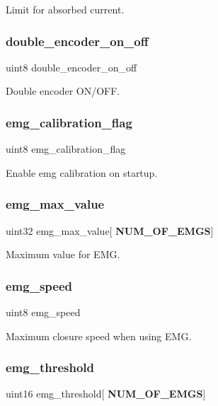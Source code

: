 Limit for absorbed current. \mbox{\label{structst__mem_a3d5832272cab9dc9f831471a9634b43e}} 
\subsubsection{double\+\_\+encoder\+\_\+on\+\_\+off}
{\footnotesize\ttfamily uint8 double\+\_\+encoder\+\_\+on\+\_\+off}

Double encoder O\+N/\+O\+FF. \mbox{\label{structst__mem_a78f0b0c6db2a7118cd15ec0aa38ccdb9}} 
\subsubsection{emg\+\_\+calibration\+\_\+flag}
{\footnotesize\ttfamily uint8 emg\+\_\+calibration\+\_\+flag}

Enable emg calibration on startup. \mbox{\label{structst__mem_aeb71cf2bff2584abb616d4b5dcc4c4af}} 
\subsubsection{emg\+\_\+max\+\_\+value}
{\footnotesize\ttfamily uint32 emg\+\_\+max\+\_\+value[\textbf{ N\+U\+M\+\_\+\+O\+F\+\_\+\+E\+M\+GS}]}

Maximum value for E\+MG. \mbox{\label{structst__mem_ae8e800591064bf14eb2dd3a3fb2c325b}} 
\subsubsection{emg\+\_\+speed}
{\footnotesize\ttfamily uint8 emg\+\_\+speed}

Maximum closure speed when using E\+MG. \mbox{\label{structst__mem_aaeb84b2fd1a137ee9234fd3c24c97aaa}} 
\subsubsection{emg\+\_\+threshold}
{\footnotesize\ttfamily uint16 emg\+\_\+threshold[\textbf{ N\+U\+M\+\_\+\+O\+F\+\_\+\+E\+M\+GS}]}

